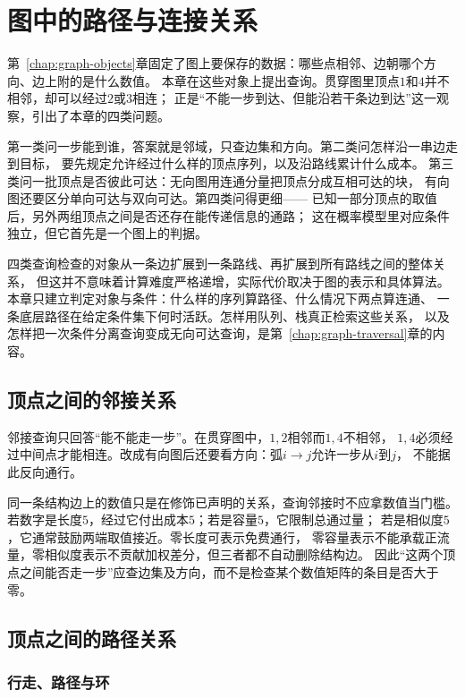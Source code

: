 \chapter{图中的路径与连接关系}
\label{chap:graph-paths}

第~\ref{chap:graph-objects}章固定了图上要保存的数据：哪些点相邻、边朝哪个方向、边上附的是什么数值。
本章在这些对象上提出查询。贯穿图里顶点$1$和$4$并不相邻，却可以经过$2$或$3$相连；
正是“不能一步到达、但能沿若干条边到达”这一观察，引出了本章的四类问题。

第一类问一步能到谁，答案就是邻域，只查边集和方向。第二类问怎样沿一串边走到目标，
要先规定允许经过什么样的顶点序列，以及沿路线累计什么成本。
第三类问一批顶点是否彼此可达：无向图用连通分量把顶点分成互相可达的块，
有向图还要区分单向可达与双向可达。第四类问得更细——
已知一部分顶点的取值后，另外两组顶点之间是否还存在能传递信息的通路；
这在概率模型里对应条件独立，但它首先是一个图上的判据。

四类查询检查的对象从一条边扩展到一条路线、再扩展到所有路线之间的整体关系，
但这并不意味着计算难度严格递增，实际代价取决于图的表示和具体算法。
本章只建立判定对象与条件：什么样的序列算路径、什么情况下两点算连通、
一条底层路径在给定条件集下何时活跃。怎样用队列、栈真正检索这些关系，
以及怎样把一次条件分离查询变成无向可达查询，是第~\ref{chap:graph-traversal}章的内容。

\section{顶点之间的邻接关系}

邻接查询只回答“能不能走一步”。在贯穿图中，$1,2$相邻而$1,4$不相邻，
$1,4$必须经过中间点才能相连。改成有向图后还要看方向：弧$i\to j$允许一步从$i$到$j$，
不能据此反向通行。

同一条结构边上的数值只是在修饰已声明的关系，查询邻接时不应拿数值当门槛。
若数字是长度$5$，经过它付出成本$5$；若是容量$5$，它限制总通过量；
若是相似度$5$，它通常鼓励两端取值接近。零长度可表示免费通行，
零容量表示不能承载正流量，零相似度表示不贡献加权差分，但三者都不自动删除结构边。
因此“这两个顶点之间能否走一步”应查边集及方向，而不是检查某个数值矩阵的条目是否大于零。

\section{顶点之间的路径关系}

\subsection{行走、路径与环}

